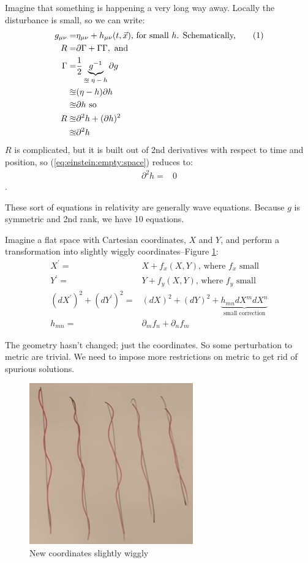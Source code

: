 \documentclass[]{article}
\newcommand\numberthis{\addtocounter{equation}{1}\tag{\theequation}}
\begin{document}
{Imagine that something is happening a very long way away. Locally the disturbance is small, so we can write:
\begin{align*}
	g_{\mu\nu} =& \eta_{\mu\nu} + h_{\mu\nu}(t,\vec{x})\text{, for small $h$. Schematically,} \numberthis \label{eq:linear:approx}\\
	R =& \partial \Gamma + \Gamma \Gamma,\text{ and }\\
	\Gamma =& \frac{1}{2} \underbrace{g^{-1}}_\text{$\approxeq\eta-h$} \partial g\\
	\approxeq& (\eta-h)\partial h\\
	\approxeq& \partial h \text{ so }\\
	R \approxeq& \partial^2 h + (\partial h)^2\\
	\approxeq & \partial^2 h
\end{align*}
$R$ is complicated, but it is built out of 2nd derivatives with respect to time and position, so (\ref{eq:einstein:empty:space}) reduces to:
\begin{align*}
	\partial^2 h=&0
\end{align*}.

These sort of equations in relativity are generally wave equations. Because $g$ is symmetric and 2nd rank, we have 10 equations.

Imagine a flat space with Cartesian coordinates, $X$ and $Y$, and perform a transformation into slightly wiggly coordinates--Figure \ref{fig:gr-10-wiggly-coordinates}:
\begin{align*}
	X^\prime =& X + f_x(X,Y) \text{, where $f_x$ small}\\
	Y^\prime =& Y + f_y(X,Y) \text{, where $f_y$ small}\\
	(dX^\prime)^2 + (dY^\prime)^2=& (dX)^2 + (dY)^2 + \underbrace{h_{mn} dX^m dX^n }_\text{small correction}\\
	h_{mn} =& \partial_m f_n + \partial_n f_m
\end{align*}

The geometry hasn't changed; just the coordinates. So some perturbation to metric are trivial. We need to impose more restrictions on metric to get rid of spurious solutions.

\begin{figure}[H]
	\begin{center}
		\caption{New coordinates slightly wiggly}\label{fig:gr-10-wiggly-coordinates}
		\includegraphics{gr-10-wiggly-coordinates}
	\end{center}
\end{figure}

}
\end{document}
